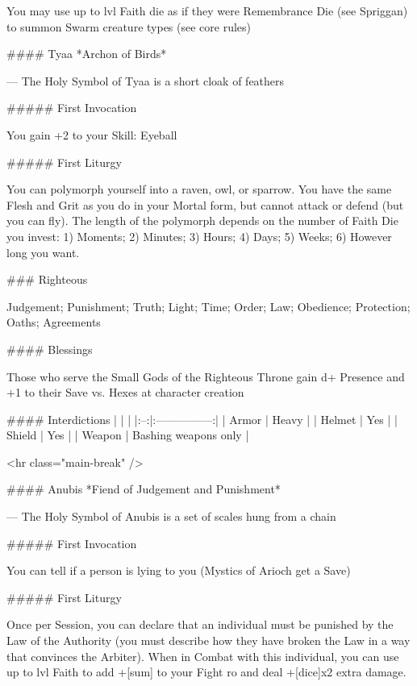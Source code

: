 You may use up to {lvl}  Faith die as if they were Remembrance Die (see Spriggan) to summon Swarm creature types (see core rules)






#### Tyaa
*Archon of Birds*

---
The Holy Symbol of Tyaa is a short cloak of feathers

##### First Invocation

You gain +2 to your Skill: Eyeball

##### First Liturgy

You can polymorph yourself into a raven, owl, or sparrow.  You have the same Flesh and Grit as you do in your Mortal form, but cannot attack or defend (but you can fly).  The length of the polymorph depends on the number of Faith Die you invest:  1) Moments; 2) Minutes; 3) Hours; 4) Days; 5) Weeks; 6) However long you want.



### Righteous



Judgement; Punishment; Truth; Light; Time; Order; Law; Obedience; Protection; Oaths; Agreements



#### Blessings

Those who serve the Small Gods of the Righteous Throne gain {d+} Presence and +1 to their Save vs. Hexes at character creation

#### Interdictions
| | |
|:--:|:---------------:|
| Armor | Heavy |
| Helmet | Yes |
| Shield | Yes |
| Weapon | Bashing weapons only |

<hr class="main-break" />

#### Anubis
*Fiend of Judgement and Punishment*

---
The Holy Symbol of Anubis is a set of scales hung from a chain

##### First Invocation

You can tell if a person is lying to you (Mystics of Arioch get a Save)

##### First Liturgy

Once per Session, you can declare that an individual must be punished by the Law of the Authority (you must describe how they have broken the Law in a way that convinces the Arbiter).  When in Combat with this individual, you can use up to {lvl} Faith to add +[sum] to your Fight {ro} and deal +[dice]x2 extra damage.





